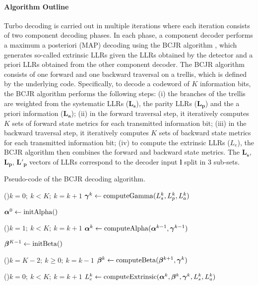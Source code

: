 \paragraph{Algorithm Outline}

Turbo decoding is carried out in multiple iterations where each iteration
consists of two component decoding phases. In each phase, a component
decoder performs a maximum a posteriori (MAP) decoding using the BCJR algorithm
\cite{Bahl1974}, which generates so-called extrinsic LLRs given the LLRs
obtained by the detector and a priori LLRs obtained from the other component
decoder. The BCJR algorithm consists of one forward and one backward traversal
on a trellis, which is defined by the underlying code. Specifically, to decode a
codeword of $K$ information bits, the BCJR algorithm performs the following
steps: (i) the branches of the trellis are weighted from the systematic LLRs
($\bm{L_s}$), the parity LLRs ($\bm{L_p}$) and the a priori information
($\bm{L_a}$); (ii) in the forward traversal step, it iteratively computes $K$
sets of forward state metrics for each transmitted information bit; (iii) in the
backward traversal step, it iteratively computes $K$ sets of backward state
metrics for each transmitted information bit; (iv) to compute the extrinsic LLRs
($L_e$), the BCJR algorithm then combines the forward and backward state
metrics. The $\bm{L_s}$, $\bm{L_p}$, $\bm{L'_p}$ vectors of LLRs correspond to
the decoder input $\bm{l}$ split in 3 sub-sets.

\begin{algorithm}
  \caption{Pseudo-code of the BCJR decoding algorithm.}
  \label{alg:alg_turbo_bcjr}

    \For(){$k=0;~k<K;~k=k+1$}
    {
      $\boldsymbol{\gamma}^k\gets \operatorname*{computeGamma}(L_{s}^k, L_{p}^k, L_{a}^k)$
    }

    $\boldsymbol{\alpha}^0\gets \operatorname*{initAlpha}()$

    \For(){$k=1;~k<K;~k=k+1$}
    {
      $\boldsymbol{\alpha}^k\gets \operatorname*{computeAlpha}(\boldsymbol{\alpha}^{k-1}, \boldsymbol{\gamma}^{k-1})$
    }

    $\boldsymbol{\beta}^{K-1}\gets \operatorname*{initBeta}()$

    \For(){$k=K-2;~k \geq 0;~k=k-1$}
    {
      $\boldsymbol{\beta}^k\gets \operatorname*{computeBeta}(\boldsymbol{\beta}^{k+1}, \boldsymbol{\gamma}^{k})$
    }

    \For(){$k=0;~k<K;~k=k+1$}
    {
      $L_e^k\gets \operatorname*{computeExtrinsic}(\boldsymbol{\alpha}^k, \boldsymbol{\beta}^{k}, \boldsymbol{\gamma}^{k}, L_{s}^k, L_{a}^k)$
    }
\end{algorithm}

